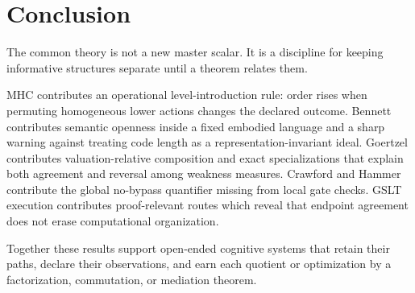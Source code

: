 \documentclass[11pt]{article}
\theoremstyle{remark}
\begin{document}
\section{Conclusion}

The common theory is not a new master scalar.  It is a discipline for keeping
informative structures separate until a theorem relates them.

MHC contributes an operational level-introduction rule: order rises when
permuting homogeneous lower actions changes the declared outcome.  Bennett
contributes semantic openness inside a fixed embodied language and a sharp
warning against treating code length as a representation-invariant ideal.
Goertzel contributes valuation-relative composition and exact specializations
that explain both agreement and reversal among weakness measures.  Crawford
and Hammer contribute the global no-bypass quantifier missing from local gate
checks.  GSLT execution contributes proof-relevant routes which reveal that
endpoint agreement does not erase computational organization.

Together these results support open-ended cognitive systems that retain their
paths, declare their observations, and earn each quotient or optimization by a
factorization, commutation, or mediation theorem.
\end{document}
